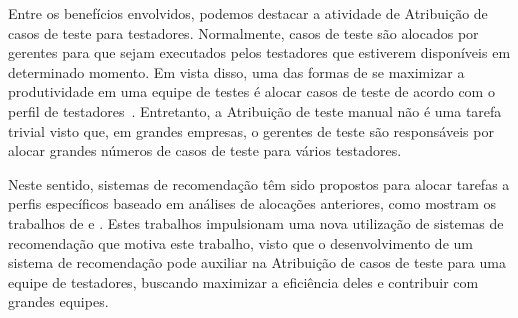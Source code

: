 Entre os benefícios envolvidos, podemos destacar a atividade de Atribuição de casos de teste para testadores.
Normalmente, casos de teste são alocados por gerentes para que sejam executados pelos testadores que estiverem disponíveis em determinado momento. Em vista disso, uma das formas de se maximizar a produtividade em uma equipe de testes é alocar casos de teste de acordo com o perfil de testadores~\cite{miranda2012recommender}. Entretanto, a Atribuição de teste manual não é uma tarefa trivial visto que,
em grandes empresas, o gerentes de teste são responsáveis por alocar grandes números de casos de teste para vários testadores.

Neste sentido, sistemas de recomendação têm sido propostos para alocar tarefas a perfis específicos baseado em análises de alocações anteriores, 
como mostram os trabalhos de \cite{anvik2006should} e \cite{miranda2012recommender}. Estes trabalhos impulsionam uma nova utilização de sistemas de recomendação que motiva este trabalho, visto que o desenvolvimento de um sistema de recomendação pode auxiliar na Atribuição de casos de teste para uma equipe de testadores, buscando maximizar a eficiência deles e contribuir com grandes equipes.
















